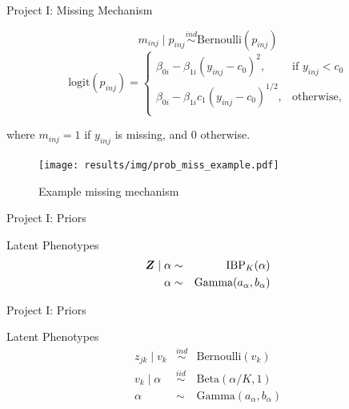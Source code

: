 \documentclass[ignorenonframetext,]{beamer}
\def\beginmyfig{\begin{figure}[H]\begin{center}}
\def\endmyfig{\end{center}\end{figure}}
\newcommand{\iid}{\overset{iid}{\sim}}
\newcommand{\p}[1]{\left(#1\right)}
\def\logit{\text{logit}}
\newcommand{\bZ}{\mbox{\boldmath $Z$}}
\newcommand{\ind}{\overset{ind}{\sim}}
\begin{document}
\begin{frame}{Project I: Missing Mechanism}

$$
  m_{inj} \mid p_{inj} \ind \text{Bernoulli}(p_{inj})
$$
\pause
$$
  \logit(p_{inj}) = \begin{cases}
  \beta_{0i} - \beta_{1i}(y_{inj}-c_0)^2, & \text{if } y_{inj} < c_0\nonumber \\
  \beta_{0i} - \beta_{1i}c_1\p{y_{inj}-c_0}^{1/2}, & \text{otherwise}, \nonumber \\
  \end{cases} 
$$

where \(m_{inj}=1\) if \(y_{inj}\) is missing, and 0 otherwise.
\beginmyfig
\texttt{[image: results/img/prob\_miss\_example.pdf]}
\caption{Example missing mechanism} \endmyfig
\end{frame}

\begin{frame}{Project I: Priors}
\begin{block}{Latent Phenotypes}
\begin{eqnarray*}
  \bZ \mid \alpha &\sim& \text{IBP}_K(\alpha) \\
  \alpha &\sim& \text{Gamma}(a_\alpha, b_\alpha) \\
\end{eqnarray*}
\end{block}
\end{frame}

\begin{frame}[noframenumbering]{Project I: Priors}
\begin{block}{Latent Phenotypes}
\begin{eqnarray*}
  z_{jk} \mid v_k  &\ind& \text{Bernoulli}(v_k) \\
  v_k  \mid \alpha &\iid& \text{Beta}\p{\alpha/K,1} \\ 
  \alpha &\sim& \text{Gamma}(a_\alpha, b_\alpha) \\
\end{eqnarray*}
\end{block}
\end{frame}
\end{document}
